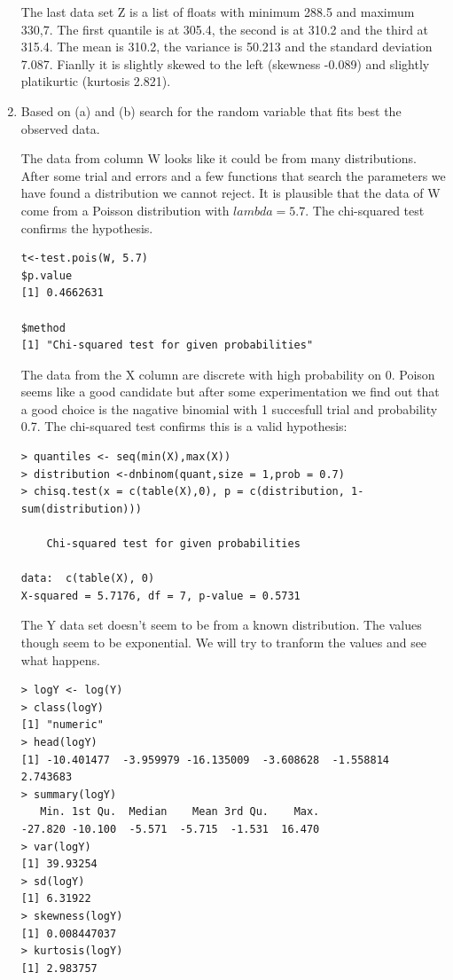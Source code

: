 \documentclass{article}
\begin{document}
\begin{enumerate}
  The last data set Z is a list of floats with minimum 288.5 and maximum 330,7.
  The first quantile is at 305.4, the second is at 310.2 and the third at 315.4.
  The mean is 310.2, the variance is 50.213 and the standard deviation 7.087.
  Fianlly it is slightly skewed to the left (skewness -0.089) and slightly
  platikurtic (kurtosis 2.821).
  
  \item Based on (a) and (b) search for the random variable that fits best the
  observed data.
  
  The data from column W looks like it could be from many distributions. After
  some trial and errors and a few functions that search the parameters we have
  found a distribution we cannot reject. It is plausible that the data of W come
  from a Poisson distribution with $lambda=5.7$. The chi-squared test confirms
  the hypothesis.
  
  \begin{lstlisting}
t<-test.pois(W, 5.7)
$p.value
[1] 0.4662631

$method
[1] "Chi-squared test for given probabilities"
  \end{lstlisting}
  
  The data from the X column are discrete with high probability on 0. Poison
  seems like a good candidate but after some experimentation we find out that a
  good choice is the nagative binomial with 1 succesfull trial and probability
  0.7. The chi-squared test confirms this is a valid hypothesis:
  
  \begin{lstlisting}
> quantiles <- seq(min(X),max(X))
> distribution <-dnbinom(quant,size = 1,prob = 0.7)
> chisq.test(x = c(table(X),0), p = c(distribution, 1-sum(distribution)))

	Chi-squared test for given probabilities

data:  c(table(X), 0)
X-squared = 5.7176, df = 7, p-value = 0.5731
  \end{lstlisting}
  
  The Y data set doesn't seem to be from a known distribution. The values though
  seem to be exponential. We will try to tranform the values and see what
  happens.
  
  \begin{lstlisting}
> logY <- log(Y)
> class(logY)
[1] "numeric"
> head(logY)
[1] -10.401477  -3.959979 -16.135009  -3.608628  -1.558814   2.743683
> summary(logY)
   Min. 1st Qu.  Median    Mean 3rd Qu.    Max. 
-27.820 -10.100  -5.571  -5.715  -1.531  16.470 
> var(logY)
[1] 39.93254
> sd(logY)
[1] 6.31922
> skewness(logY)
[1] 0.008447037
> kurtosis(logY)
[1] 2.983757
  \end{lstlisting}
  

\end{enumerate}
\end{document}
